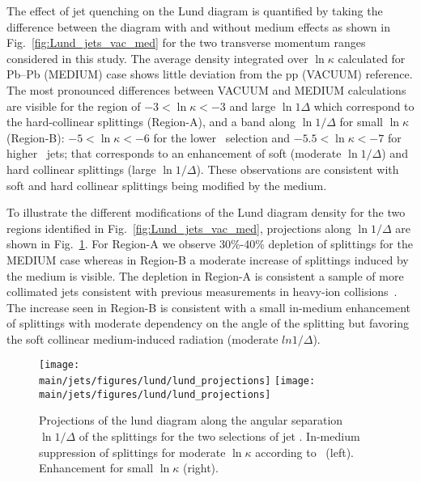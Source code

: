 The effect of jet quenching on the Lund diagram is quantified by taking the difference between the diagram with and without medium effects as shown in Fig.~\ref{fig:Lund_jets_vac_med} for the two transverse momentum ranges considered in this study. 
The average density integrated over $\ln \kappa$ calculated for Pb--Pb (MEDIUM) case shows little deviation from the pp (VACUUM) reference. 
The most pronounced differences between VACUUM and MEDIUM calculations are visible for the region of $-3 < \ln \kappa < -3$ and large $\ln 1\Delta$ which correspond to the hard-collinear splittings (Region-A), and a band along $\ln 1/\Delta$ for small $\ln \kappa$ (Region-B): $-5 < \ln \kappa < -6$ for the lower \pt\ selection and $-5.5 < \ln \kappa < -7$ for higher \pt\ jets; that corresponds to an enhancement of soft (moderate $\ln 1/\Delta$) and hard collinear splittings (large $\ln 1/\Delta$). 
These observations are consistent with soft and hard collinear splittings being modified by the medium.

To illustrate the different modifications of the Lund diagram density for the two regions identified in Fig.~\ref{fig:Lund_jets_vac_med}, projections along $\ln 1/\Delta$ are shown in Fig.~\ref{fig:Lund_projections}. For Region-A we observe 30\%-40\% depletion of splittings for the MEDIUM case whereas in Region-B a moderate increase of splittings induced by the medium is visible. The depletion in Region-A is consistent a sample of more collimated jets consistent with previous measurements in heavy-ion collisions~\cite{Acharya:2018uvf,Sirunyan:2018jqr}. The increase seen in Region-B is consistent with a small in-medium enhancement of splittings with moderate dependency on the angle of the splitting but favoring the soft collinear medium-induced radiation (moderate $ln 1/\Delta$).
\begin{figure}[htbp]
	\centering
	\texttt{[image: \\main/jets/figures/lund/lund\_projections]}
	\texttt{[image: \\main/jets/figures/lund/lund\_projections]}
	\caption{Projections of the lund diagram along the angular separation $\ln 1/\Delta$ of the splittings for the two selections of jet \pt. In-medium suppression of splittings for moderate $\ln{\kappa}$ according to \jewel\ (left). Enhancement for small $\ln{\kappa}$ (right).}
	\label{fig:Lund_projections}
\end{figure}

